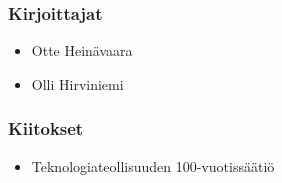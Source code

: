 \subsubsection*{Kirjoittajat}
\begin{itemize}
\item Otte Heinävaara
\item Olli Hirviniemi
\end{itemize}

\subsubsection*{Kiitokset}
\begin{itemize}
\item Teknologiateollisuuden 100-vuotissäätiö
\end{itemize}
